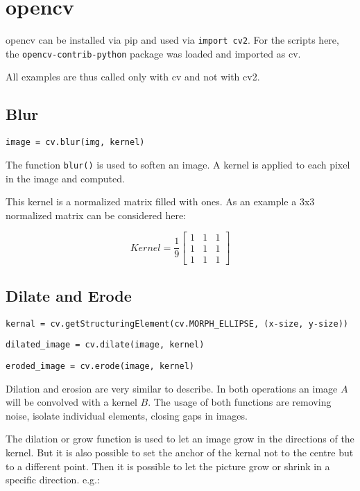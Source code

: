\author{Florian Müller}
\graphicspath{ {./src/chapters/developer/media/ld_live/} }
\section {opencv}

opencv can be installed via pip and used via \texttt{import cv2}.
For the scripts here, the \texttt{opencv-contrib-python} package was loaded and imported as cv.

All examples are thus called only with cv and not with cv2.

\subsection {Blur}

\texttt{image = cv.blur(img, kernel)}

The function \texttt{blur()} is used to soften an image.
A kernel is applied to each pixel in the image and computed.

This kernel is a normalized matrix filled with ones.
As an example a 3x3 normalized matrix can be considered here:

$$Kernel = \frac{1}{9}
\begin{bmatrix}
1 &1 &1 \\
1 &1 &1 \\
1 &1 &1
\end{bmatrix}
$$


\subsection {Dilate and Erode}

\texttt{kernal = cv.getStructuringElement(cv.MORPH\_ELLIPSE, (x-size, y-size))}

\texttt{dilated\_image = cv.dilate(image, kernel)}

\texttt{eroded\_image = cv.erode(image, kernel)}

Dilation and erosion are very similar to describe.
In both operations an image $A$ will be convolved with a kernel $B$.
The usage of both functions are removing noise, isolate individual elements, closing gaps in images.

The dilation or grow function is used to let an image grow in the directions of the kernel.
But it is also possible to set the anchor of the kernal not to the centre but to a different point.
Then it is possible to let the picture grow or shrink in a specific direction.
e.g.:

